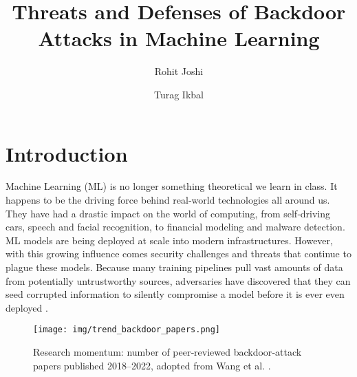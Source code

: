 \documentclass[sigconf,authorversion,nonacm,balance=false]{acmart}
\begin{document}
\title{Threats and Defenses of Backdoor Attacks in Machine Learning}

\author{Rohit Joshi}

\author{Turag Ikbal}

\maketitle

\section{Introduction}
\label{sec:intro}

Machine Learning (ML) is no longer something theoretical we learn in class. It happens to be the driving force behind real‑world technologies all around us. They have had a drastic impact on the world of computing, from self‑driving cars, speech and facial recognition, to financial modeling and malware detection. ML models are being deployed at scale into modern infrastructures. However, with this growing influence comes security challenges and threats that continue to plague these models. Because many training pipelines pull vast amounts of data from potentially untrustworthy sources, adversaries have discovered that they can seed corrupted information to silently compromise a model before it is ever even deployed \cite{background_attack_defense_goldblum_2023}.

\begin{figure}[t]
  \centering
  \texttt{[image: img/trend\_backdoor\_papers.png]}%
  \caption{Research momentum: number of peer‑reviewed backdoor‑attack papers published 2018–2022, adopted from Wang et al. \cite{attack_defense_wang_2023}.}
  \label{fig:trend}
\end{figure}
\end{document}
